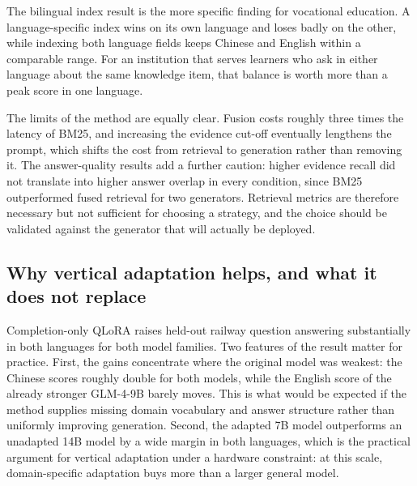 \documentclass{article}
\begin{document}
The bilingual index result is the more specific finding for vocational education. A language-specific index wins on its own language and loses badly on the other, while indexing both language fields keeps Chinese and English within a comparable range. For an institution that serves learners who ask in either language about the same knowledge item, that balance is worth more than a peak score in one language.

The limits of the method are equally clear. Fusion costs roughly three times the latency of BM25, and increasing the evidence cut-off eventually lengthens the prompt, which shifts the cost from retrieval to generation rather than removing it. The answer-quality results add a further caution: higher evidence recall did not translate into higher answer overlap in every condition, since BM25 outperformed fused retrieval for two generators. Retrieval metrics are therefore necessary but not sufficient for choosing a strategy, and the choice should be validated against the generator that will actually be deployed.

\subsection{Why vertical adaptation helps, and what it does not replace}

Completion-only QLoRA raises held-out railway question answering substantially in both languages for both model families. Two features of the result matter for practice. First, the gains concentrate where the original model was weakest: the Chinese scores roughly double for both models, while the English score of the already stronger GLM-4-9B barely moves. This is what would be expected if the method supplies missing domain vocabulary and answer structure rather than uniformly improving generation. Second, the adapted 7B model outperforms an unadapted 14B model by a wide margin in both languages, which is the practical argument for vertical adaptation under a hardware constraint: at this scale, domain-specific adaptation buys more than a larger general model.
\end{document}
